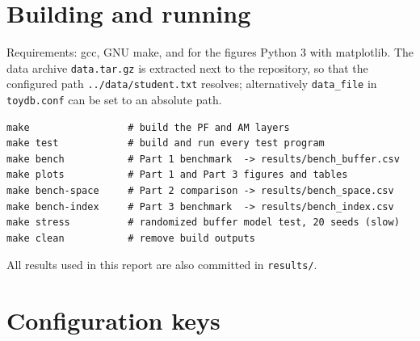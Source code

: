 \documentclass[11pt,a4paper]{article}
\begin{document}
\appendix
\section{Building and running}
\label{app:build}

Requirements: gcc, GNU make, and for the figures Python 3 with matplotlib. The data archive \texttt{data.tar.gz} is extracted next to the repository, so that the configured path \texttt{../data/student.txt} resolves; alternatively \texttt{data\_file} in \texttt{toydb.conf} can be set to an absolute path.

\begin{lstlisting}
make                 # build the PF and AM layers
make test            # build and run every test program
make bench           # Part 1 benchmark  -> results/bench_buffer.csv
make plots           # Part 1 and Part 3 figures and tables
make bench-space     # Part 2 comparison -> results/bench_space.csv
make bench-index     # Part 3 benchmark  -> results/bench_index.csv
make stress          # randomized buffer model test, 20 seeds (slow)
make clean           # remove build outputs
\end{lstlisting}

All results used in this report are also committed in \texttt{results/}.

\section{Configuration keys}
\label{app:config}
\end{document}
